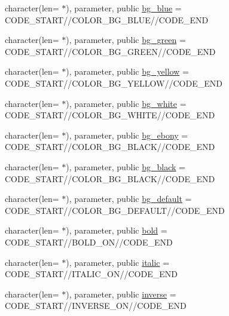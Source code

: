 \begin{DoxyCompactItemize}
\item 
character(len= $\ast$), parameter, public \mbox{\hyperlink{namespacem__escape_afab2229302287eaa0eb05add07bb6621}{bg\+\_\+blue}} = C\+O\+D\+E\+\_\+\+S\+T\+A\+RT//C\+O\+L\+O\+R\+\_\+\+B\+G\+\_\+\+B\+L\+UE//C\+O\+D\+E\+\_\+\+E\+ND
\item 
character(len= $\ast$), parameter, public \mbox{\hyperlink{namespacem__escape_a5754e4af92f738d3fd7c95daeaa7f2e1}{bg\+\_\+green}} = C\+O\+D\+E\+\_\+\+S\+T\+A\+RT//C\+O\+L\+O\+R\+\_\+\+B\+G\+\_\+\+G\+R\+E\+EN//C\+O\+D\+E\+\_\+\+E\+ND
\item 
character(len= $\ast$), parameter, public \mbox{\hyperlink{namespacem__escape_afe23b71a7646ac88c8c74358994f92d0}{bg\+\_\+yellow}} = C\+O\+D\+E\+\_\+\+S\+T\+A\+RT//C\+O\+L\+O\+R\+\_\+\+B\+G\+\_\+\+Y\+E\+L\+L\+OW//C\+O\+D\+E\+\_\+\+E\+ND
\item 
character(len= $\ast$), parameter, public \mbox{\hyperlink{namespacem__escape_a87dfd88e3190a8717cc574d4f2a4445c}{bg\+\_\+white}} = C\+O\+D\+E\+\_\+\+S\+T\+A\+RT//C\+O\+L\+O\+R\+\_\+\+B\+G\+\_\+\+W\+H\+I\+TE//C\+O\+D\+E\+\_\+\+E\+ND
\item 
character(len= $\ast$), parameter, public \mbox{\hyperlink{namespacem__escape_ab3691cc02cfaf12d6f7e18fac8a70b0b}{bg\+\_\+ebony}} = C\+O\+D\+E\+\_\+\+S\+T\+A\+RT//C\+O\+L\+O\+R\+\_\+\+B\+G\+\_\+\+B\+L\+A\+CK//C\+O\+D\+E\+\_\+\+E\+ND
\item 
character(len= $\ast$), parameter, public \mbox{\hyperlink{namespacem__escape_a2f34e53ba01ebac10ab70f25e3c9727a}{bg\+\_\+black}} = C\+O\+D\+E\+\_\+\+S\+T\+A\+RT//C\+O\+L\+O\+R\+\_\+\+B\+G\+\_\+\+B\+L\+A\+CK//C\+O\+D\+E\+\_\+\+E\+ND
\item 
character(len= $\ast$), parameter, public \mbox{\hyperlink{namespacem__escape_a329b88dbfe4ad42f896cdf408dcd9784}{bg\+\_\+default}} = C\+O\+D\+E\+\_\+\+S\+T\+A\+RT//C\+O\+L\+O\+R\+\_\+\+B\+G\+\_\+\+D\+E\+F\+A\+U\+LT//C\+O\+D\+E\+\_\+\+E\+ND
\item 
character(len= $\ast$), parameter, public \mbox{\hyperlink{namespacem__escape_a9a369de1d051ce7fdbdedcba4574c962}{bold}} = C\+O\+D\+E\+\_\+\+S\+T\+A\+RT//B\+O\+L\+D\+\_\+\+ON//C\+O\+D\+E\+\_\+\+E\+ND
\item 
character(len= $\ast$), parameter, public \mbox{\hyperlink{namespacem__escape_afbb060c43fe019ca7fc699073cf30399}{italic}} = C\+O\+D\+E\+\_\+\+S\+T\+A\+RT//I\+T\+A\+L\+I\+C\+\_\+\+ON//C\+O\+D\+E\+\_\+\+E\+ND
\item 
character(len= $\ast$), parameter, public \mbox{\hyperlink{namespacem__escape_a568054a95202a9290fc4f314ff7c9012}{inverse}} = C\+O\+D\+E\+\_\+\+S\+T\+A\+RT//I\+N\+V\+E\+R\+S\+E\+\_\+\+ON//C\+O\+D\+E\+\_\+\+E\+ND

\end{DoxyCompactItemize}
